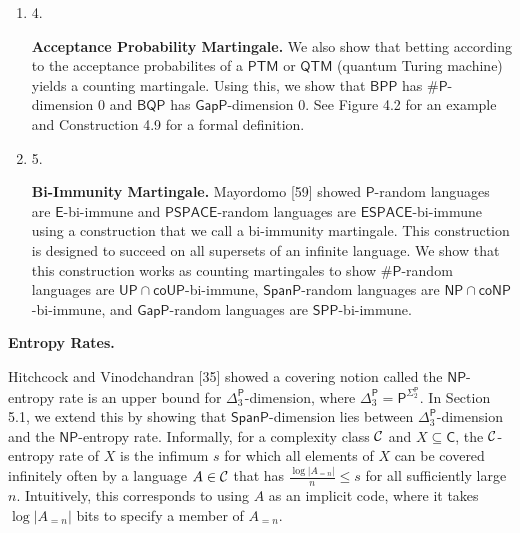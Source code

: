 \begin{enumerate}
\item[] 
4. 


\textbf{Acceptance Probability Martingale.}
We also show that betting according to the acceptance probabilites of a $\mathsf{PTM}$ or $\mathsf{QTM}$ (quantum Turing machine) yields a counting martingale. Using this, we show that $\mathsf{BPP}$ has ${\mathsf{\#}\mathsf{P}}$-dimension 0 and $\mathsf{BQP}$ has $\mathsf{GapP}$-dimension 0. See Figure 4.2 for an example and Construction 4.9 for a formal definition.\par





\item[] 
5. 


\textbf{Bi-Immunity Martingale.} Mayordomo [59] showed $\mathsf{P}$-random languages are $\mathsf{E}$-bi-immune and $\mathsf{PSPACE}$-random languages are $\mathsf{ESPACE}$-bi-immune using a construction that we call a bi-immunity martingale.
This construction is designed to succeed on all supersets of an infinite language. We show that this construction works as counting martingales to show ${\mathsf{\#}\mathsf{P}}$-random languages are $\mathsf{UP}\cap\mathsf{co}\mathsf{UP}$-bi-immune, $\mathsf{SpanP}$-random languages are $\mathsf{NP}\cap\mathsf{co}\mathsf{NP}$-bi-immune, and $\mathsf{GapP}$-random languages are $\mathsf{SPP}$-bi-immune.\par





\end{enumerate}




\par\medskip\noindent\textbf{Entropy Rates.}\par




Hitchcock and Vinodchandran [35] showed a covering notion called the $\mathsf{NP}$-entropy rate is an upper bound for ${\Delta^{\mathsf{P}}_{3}}$-dimension, where ${\Delta^{\mathsf{P}}_{3}}=\mathsf{P}^{{\Sigma^{\mathsf{P}}_{2}}}$. In Section 5.1, we extend this by showing that $\mathsf{SpanP}$-dimension lies between ${\Delta^{\mathsf{P}}_{3}}$-dimension and the $\mathsf{NP}$-entropy rate. Informally, for a complexity class ${\cal C}$ and $X\subseteq\mathsf{C}$, the ${\cal C}$-entropy rate of $X$ is the infimum $s$ for which all elements of $X$ can be covered infinitely often by a language $A\in{\cal C}$ that has $\frac{\log|A_{=n}|}{n}\leq s$ for all sufficiently large $n$. Intuitively, this corresponds to using $A$ as an implicit code, where it takes $\log|A_{=n}|$ bits to specify a member of $A_{=n}$.\par





